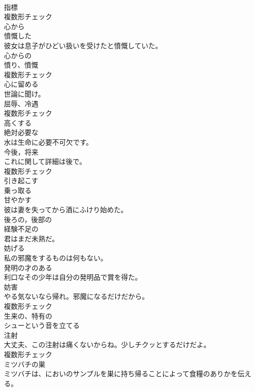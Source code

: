 \documentclass[8pt]{extreport}
\begin{document}
\begin{CJK}{UTF8}{min}
\\	[名詞]	指標	
\\	複数形チェック
\\	[副詞]	心から	
\\	[形容詞]	憤慨した	
\\	彼女は息子がひどい扱いを受けたと憤慨していた。	
\\	[形容詞]	心からの	
\\	[名詞]	憤り、憤慨	
\\	複数形チェック
\\	[動詞]	心に留める	
\\	世論に聞け。	
\\	[名詞]	屈辱、冷遇	
\\	複数形チェック
\\	[動詞]	高くする	
\\	[形容詞]	絶対必要な	
\\	水は生命に必要不可欠です。	
\\	[名詞]	今後，将来	
\\	これに関して詳細は後で。	
\\	複数形チェック
\\	[動詞]	引き起こす	
\\	[動詞]	乗っ取る	
\\	[動詞]	甘やかす	
\\	彼は妻を失ってから酒にふけり始めた。	
\\	[形容詞]	後ろの，後部の	
\\	[形容詞]	経験不足の	
\\	君はまだ未熟だ。	
\\	[動詞]	妨げる	
\\	私の邪魔をするものは何もない。	
\\	[形容詞]	発明の才のある	
\\	利口なその少年は自分の発明品で賞を得た。	
\\	[名詞]	妨害	
\\	やる気ないなら帰れ。邪魔になるだけだから。	
\\	複数形チェック
\\	[形容詞]	生来の、特有の	
\\	[動詞]	シューという音を立てる	
\\	[名詞]	注射	
\\	大丈夫、この注射は痛くないからね。少しチクッとするだけだよ。	
\\	複数形チェック
\\	[名詞]	ミツバチの巣	
\\	ミツバチは、においのサンプルを巣に持ち帰ることによって食糧のありかを伝える。	

\end{CJK}
\end{document}
